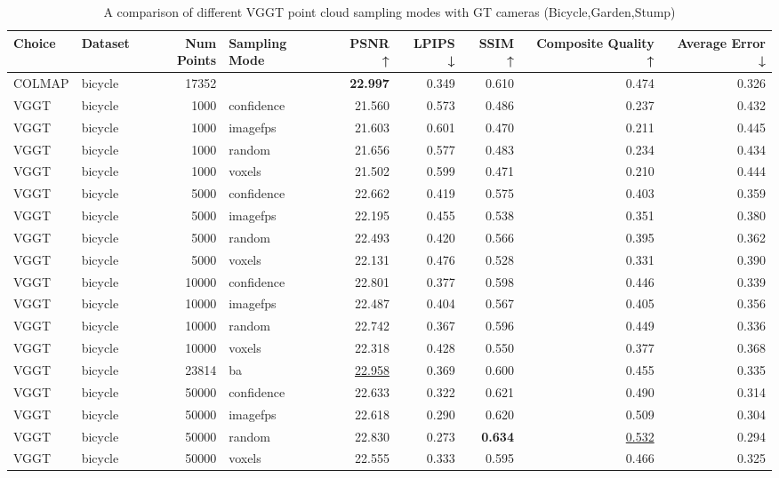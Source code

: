 \begin{table}[H]
\caption{A comparison of different VGGT point cloud sampling modes with GT cameras (Bicycle,Garden,Stump)}
\label{tab:03_sampling_mode_gt_cams_bicycle,garden,stump}
\small
\begin{tabular}{llrlrrrrr}
\toprule
Choice & Dataset & Num Points & Sampling Mode & PSNR ↑ & LPIPS ↓ & SSIM ↑ & Composite Quality ↑ & Average Error ↓ \\
\midrule
COLMAP & bicycle & 17352 &  & \textbf{22.997} & 0.349 & 0.610 & 0.474 & 0.326 \\
VGGT & bicycle & 1000 & confidence & 21.560 & 0.573 & 0.486 & 0.237 & 0.432 \\
VGGT & bicycle & 1000 & imagefps & 21.603 & 0.601 & 0.470 & 0.211 & 0.445 \\
VGGT & bicycle & 1000 & random & 21.656 & 0.577 & 0.483 & 0.234 & 0.434 \\
VGGT & bicycle & 1000 & voxels & 21.502 & 0.599 & 0.471 & 0.210 & 0.444 \\
VGGT & bicycle & 5000 & confidence & 22.662 & 0.419 & 0.575 & 0.403 & 0.359 \\
VGGT & bicycle & 5000 & imagefps & 22.195 & 0.455 & 0.538 & 0.351 & 0.380 \\
VGGT & bicycle & 5000 & random & 22.493 & 0.420 & 0.566 & 0.395 & 0.362 \\
VGGT & bicycle & 5000 & voxels & 22.131 & 0.476 & 0.528 & 0.331 & 0.390 \\
VGGT & bicycle & 10000 & confidence & 22.801 & 0.377 & 0.598 & 0.446 & 0.339 \\
VGGT & bicycle & 10000 & imagefps & 22.487 & 0.404 & 0.567 & 0.405 & 0.356 \\
VGGT & bicycle & 10000 & random & 22.742 & 0.367 & 0.596 & 0.449 & 0.336 \\
VGGT & bicycle & 10000 & voxels & 22.318 & 0.428 & 0.550 & 0.377 & 0.368 \\
VGGT & bicycle & 23814 & ba & \underline{22.958} & 0.369 & 0.600 & 0.455 & 0.335 \\
VGGT & bicycle & 50000 & confidence & 22.633 & 0.322 & 0.621 & 0.490 & 0.314 \\
VGGT & bicycle & 50000 & imagefps & 22.618 & 0.290 & 0.620 & 0.509 & 0.304 \\
VGGT & bicycle & 50000 & random & 22.830 & 0.273 & \textbf{0.634} & \underline{0.532} & 0.294 \\
VGGT & bicycle & 50000 & voxels & 22.555 & 0.333 & 0.595 & 0.466 & 0.325 \\

\end{tabular}
\end{table}
